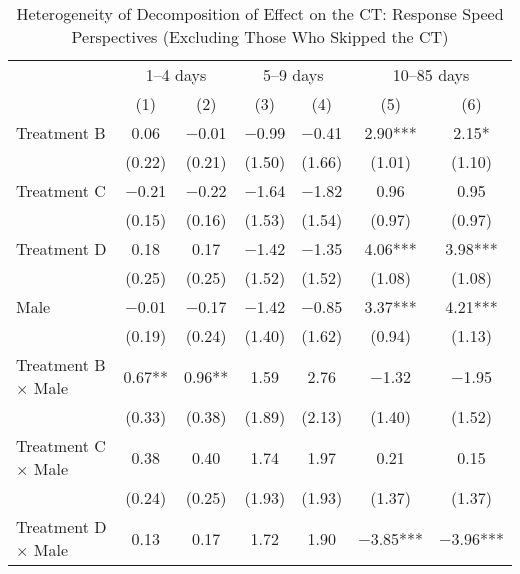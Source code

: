 \documentclass[12pt, a4paper]{article}
\begin{document}
\begin{table}[H]

\caption{\label{tab:lm-interaction-gender-test-time-decompose-noskip}Heterogeneity of Decomposition of Effect on the CT: Response Speed Perspectives (Excluding Those Who Skipped the CT)}
\centering
\fontsize{8}{10}\selectfont
\begin{threeparttable}
\begin{tabular}[t]{lcccccc}
\toprule
\multicolumn{1}{c}{ } & \multicolumn{2}{c}{1--4 days} & \multicolumn{2}{c}{5--9 days} & \multicolumn{2}{c}{10--85 days} \\
\cmidrule(l{3pt}r{3pt}){2-3} \cmidrule(l{3pt}r{3pt}){4-5} \cmidrule(l{3pt}r{3pt}){6-7}
  & (1) & (2) & (3) & (4) & (5) & (6)\\
\midrule
Treatment B & \num{0.06} & \num{-0.01} & \num{-0.99} & \num{-0.41} & \num{2.90}*** & \num{2.15}*\\
 & (\num{0.22}) & (\num{0.21}) & (\num{1.50}) & (\num{1.66}) & (\num{1.01}) & (\num{1.10})\\
Treatment C & \num{-0.21} & \num{-0.22} & \num{-1.64} & \num{-1.82} & \num{0.96} & \num{0.95}\\
 & (\num{0.15}) & (\num{0.16}) & (\num{1.53}) & (\num{1.54}) & (\num{0.97}) & (\num{0.97})\\
Treatment D & \num{0.18} & \num{0.17} & \num{-1.42} & \num{-1.35} & \num{4.06}*** & \num{3.98}***\\
 & (\num{0.25}) & (\num{0.25}) & (\num{1.52}) & (\num{1.52}) & (\num{1.08}) & (\num{1.08})\\
Male & \num{-0.01} & \num{-0.17} & \num{-1.42} & \num{-0.85} & \num{3.37}*** & \num{4.21}***\\
 & (\num{0.19}) & (\num{0.24}) & (\num{1.40}) & (\num{1.62}) & (\num{0.94}) & (\num{1.13})\\
Treatment B $\times$ Male & \num{0.67}** & \num{0.96}** & \num{1.59} & \num{2.76} & \num{-1.32} & \num{-1.95}\\
 & (\num{0.33}) & (\num{0.38}) & (\num{1.89}) & (\num{2.13}) & (\num{1.40}) & (\num{1.52})\\
Treatment C $\times$ Male & \num{0.38} & \num{0.40} & \num{1.74} & \num{1.97} & \num{0.21} & \num{0.15}\\
 & (\num{0.24}) & (\num{0.25}) & (\num{1.93}) & (\num{1.93}) & (\num{1.37}) & (\num{1.37})\\
Treatment D $\times$ Male & \num{0.13} & \num{0.17} & \num{1.72} & \num{1.90} & \num{-3.85}*** & \num{-3.96}***\\

\end{tabular}
\end{threeparttable}
\end{table}
\end{document}
